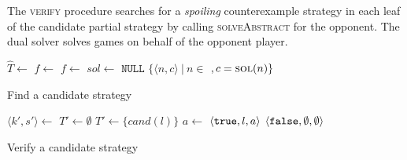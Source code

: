 The \textsc{verify} procedure searches for a \emph{spoiling} counterexample strategy in each leaf of the candidate partial strategy by calling \textsc{solveAbstract} for the opponent. The dual solver solves games on behalf of the opponent player.  

\begin{algorithm}
    \begin{algorithmic}
        \State $\hat{T} \gets $  
                \State $f \gets $ 
            \Else
                \State $f \gets $ 
            \EndIf
            \State $sol \gets $ 
                \State \Return $\texttt{NULL}$ 
            \Else
                \State \Return $\{ \langle n, c \rangle\ |\ n \in $ $, c = \Call{sol}{n} \}$
            \EndIf
        \EndFunction
    \end{algorithmic}
    \caption{Find a candidate strategy}
    \label{alg:findcandidate}
\end{algorithm}


\begin{algorithm}
    \begin{algorithmic}
            \State $\langle k', s'\rangle \gets $  
                \State $T' \gets \emptyset$
            \Else
                \State $T' \gets \{ cand(l) \}$
            \EndIf
                \State $a \gets $  
                 \Return $\langle \texttt{true}, l, a \rangle$ \EndIIf {}
            \EndFor
            \State \Return $\langle \texttt{false}, \emptyset, \emptyset \rangle$ 
        \EndFunction
    \end{algorithmic}

    \caption{Verify a candidate strategy}
    \label{alg:verify}
\end{algorithm}

